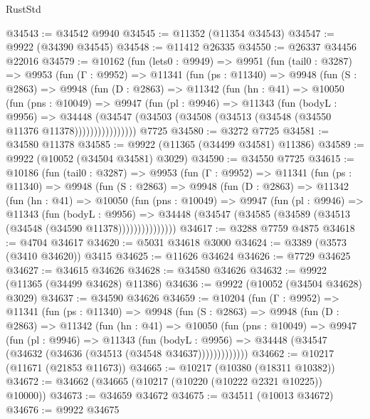 \begin{lexlean}{RustStd}
\begin{coremodule}
@34543 := @34542 @9940
@34545 := @11352 (@11354 @34543)
@34547 := @9922 (@34390 @34545)
@34548 := @11412 @26335
@34550 := @26337 @34456 @22016
@34579 := @10162
    (fun (lets0 : @9949) =>
    @9951
      (fun (tail0 : @3287) =>
      @9953
        (fun (Γ : @9952) =>
        @11341
          (fun (ps : @11340) =>
          @9948
            (fun (S : @2863) =>
            @9948
              (fun (D : @2863) =>
              @11342
                (fun (hn : @41) =>
                @10050
                  (fun (pns : @10049) =>
                  @9947
                    (fun (pl : @9946) =>
                    @11343
                      (fun (bodyL : @9956) =>
                      @34448
                        (@34547
                          (@34503 (@34508 (@34513 (@34548 (@34550 @11376 @11378))))))))))))))))
    @7725
@34580 := @3272 @7725
@34581 := @34580 @11378
@34585 := @9922 (@11365 (@34499 @34581) @11386)
@34589 := @9922 (@10052 (@34504 @34581) @3029)
@34590 := @34550 @7725
@34615 := @10186
    (fun (tail0 : @3287) =>
    @9953
      (fun (Γ : @9952) =>
      @11341
        (fun (ps : @11340) =>
        @9948
          (fun (S : @2863) =>
          @9948
            (fun (D : @2863) =>
            @11342
              (fun (hn : @41) =>
              @10050
                (fun (pns : @10049) =>
                @9947
                  (fun (pl : @9946) =>
                  @11343
                    (fun (bodyL : @9956) =>
                    @34448 (@34547 (@34585 (@34589 (@34513 (@34548 (@34590 @11378)))))))))))))))
@34617 := @3288 @7759 @4875
@34618 := @4704 @34617
@34620 := @5031 @34618 @3000
@34624 := @3389 (@3573 (@3410 @34620)) @3415
@34625 := @11626 @34624
@34626 := @7729 @34625
@34627 := @34615 @34626
@34628 := @34580 @34626
@34632 := @9922 (@11365 (@34499 @34628) @11386)
@34636 := @9922 (@10052 (@34504 @34628) @3029)
@34637 := @34590 @34626
@34659 := @10204
    (fun (Γ : @9952) =>
    @11341
      (fun (ps : @11340) =>
      @9948
        (fun (S : @2863) =>
        @9948
          (fun (D : @2863) =>
          @11342
            (fun (hn : @41) =>
            @10050
              (fun (pns : @10049) =>
              @9947
                (fun (pl : @9946) =>
                @11343
                  (fun (bodyL : @9956) =>
                  @34448 (@34547 (@34632 (@34636 (@34513 (@34548 @34637)))))))))))))
@34662 := @10217 (@11671 (@21853 @11673))
@34665 := @10217 (@10380 (@18311 @10382))
@34672 := @34662 (@34665 (@10217 (@10220 (@10222 @2321 @10225)) @10000))
@34673 := @34659 @34672
@34675 := @34511 (@10013 @34672)
@34676 := @9922 @34675

\end{coremodule}
\end{lexlean}
